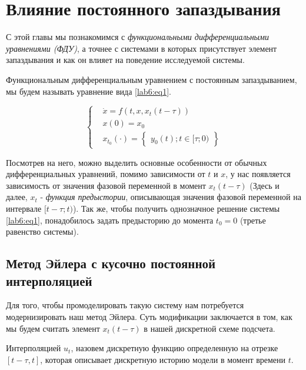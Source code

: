 \chapter{Влияние постоянного запаздывания}\label{lab6}

С этой главы мы познакомимся с \textit{функциональными дифференциальными
уравнениями (ФДУ)}, а точнее с системами в которых присутствует элемент
запаздывания и как он влияет на поведение исследуемой системы.

\begin{definition}
    Функциональным дифференциальным уравнением с постоянным запаздыванием,
    мы будем называть уравнение вида \eqref{lab6:eq1}.
\end{definition}

\begin{equation}\label{lab6:eq1}
    \begin{cases}
        &\dot{x} = f(t, x, x_t(t - \tau)) \\
        &x(0) = x_0 \\
        &x_{t_0}(\cdot) = \begin{Bmatrix}y_0(t); t \in [\tau;0)\end{Bmatrix}
    \end{cases}
\end{equation}

Посмотрев на него, можно выделить основные особенности от обычных дифференциальных
уравнений, помимо зависимости от $t$ и $x$, у нас появляется зависимость от
значения фазовой переменной в момент $x_t(t-\tau)$ (Здесь и далее, $x_t$ - \textit{функция
предыстории}, описывающая значения фазовой переменной на интервале $[t-\tau;t)$).
Так же, чтобы получить однозначное решение системы \eqref{lab6:eq1}, понадобилось
задать предысторию до момента $t_0 = 0$ (третье равенство системы).

\section{Метод Эйлера с кусочно постоянной интерполяцией}
Для того, чтобы промоделировать такую систему нам потребуется
модернизировать наш метод Эйлера. Суть модификации заключается
в том, как мы будем считать элемент $x_t(t - \tau)$ в нашей
дискретной схеме подсчета.

\begin{definition}
    Интерполяцией $u_t$, назовем дискретную функцию определенную на отрезке
    $[t-\tau, t]$, которая описывает дискретную историю модели в момент времени
    $t$.
\end{definition}

